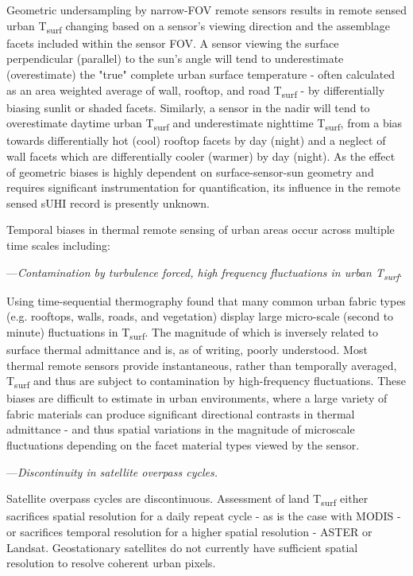 Geometric undersampling by narrow-FOV remote sensors results in remote sensed urban T\textsubscript{surf} changing based on a sensor's viewing direction and the assemblage facets included within the sensor FOV. A sensor viewing the surface perpendicular (parallel) to the sun's angle will tend to underestimate (overestimate) the "true" complete urban surface temperature - often calculated as an area weighted average of wall, rooftop, and road T\textsubscript{surf} - by differentially biasing sunlit or shaded facets. Similarly, a sensor in the nadir will tend to overestimate daytime urban T\textsubscript{surf} and underestimate nighttime T\textsubscript{surf}, from a bias towards differentially hot (cool) rooftop facets by day (night) and a neglect of wall facets which are differentially cooler (warmer) by day (night). As the effect of geometric biases is highly dependent on surface-sensor-sun geometry and requires significant instrumentation for quantification, its influence in the remote sensed sUHI record is presently unknown.

Temporal biases in thermal remote sensing of urban areas occur across multiple time scales including: 

\noindent---\textit{Contamination by turbulence forced, high frequency fluctuations in urban T\textsubscript{surf}}. 

Using time-sequential thermography \citet{Christen2012} found that many common urban fabric types (e.g. rooftops, walls, roads, and vegetation) display large micro-scale (second to minute) fluctuations in T\textsubscript{surf}. The magnitude of which is inversely related to surface thermal admittance and is, as of writing, poorly understood. Most thermal remote sensors provide instantaneous, rather than temporally averaged, T\textsubscript{surf} and thus are subject to contamination by high-frequency fluctuations. These biases are difficult to estimate in urban environments, where a large variety of fabric materials can produce significant directional contrasts in thermal admittance - and thus spatial variations in the magnitude of microscale fluctuations depending on the facet material types viewed by the sensor. 

\noindent---\textit{Discontinuity in satellite overpass cycles.}

Satellite overpass cycles are discontinuous. Assessment of land T\textsubscript{surf} either sacrifices spatial resolution for a daily repeat cycle - as is the case with MODIS  - or sacrifices temporal resolution for a higher spatial resolution - ASTER or Landsat. Geostationary satellites do not currently have sufficient spatial resolution to resolve coherent urban pixels.

